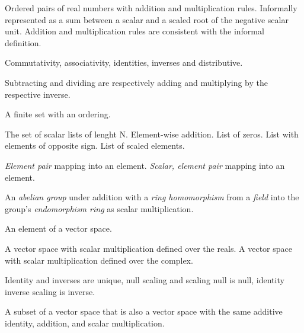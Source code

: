 \pagebreak


\begin{multicols}{3}

  Ordered pairs of real numbers with addition and multiplication rules.
  Informally represented as a sum between a scalar and a scaled root of the negative scalar unit.
  Addition and multiplication rules are consistent with the informal definition.

  Commutativity, associativity, identities, inverses and distributive.

  Subtracting and dividing are respectively adding and multiplying by the respective inverse.

  A finite set with an ordering.

  The set of scalar lists of lenght N.
   Element-wise addition.
   List of zeros.
   List with elements of opposite sign.
   List of scaled elements.

   \textit{Element pair} mapping into an element.
   \textit{Scalar, element pair} mapping into an element.

  An \textit{abelian group} under addition with a \textit{ring homomorphism} from a \textit{field} into the group's \textit{endomorphism ring} as scalar multiplication.

  An element of a vector space.

   A vector space with scalar multiplication defined over the reals.
   A vector space with scalar multiplication defined over the complex.

  Identity and inverses are unique, null scaling and scaling null is null, identity inverse scaling is inverse.

  A subset of a vector space that is also a vector space with the same additive identity, addition, and scalar multiplication.


\end{multicols}
